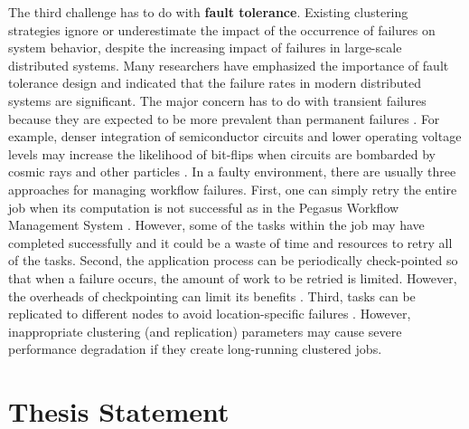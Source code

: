 The third challenge has to do with \textbf{fault tolerance}. Existing clustering strategies ignore or underestimate the impact of the occurrence of failures on system behavior, despite the increasing impact of failures in large-scale distributed systems. Many researchers \cite{Zhang2004, Tang1990, Schroeder2006, Sahoo2004} have emphasized the importance of fault tolerance design and indicated that the failure rates in modern distributed systems are significant. The major concern has to do with transient failures because they are expected to be more prevalent than permanent failures \cite{Zhang2004}. For example, denser integration of semiconductor circuits and lower operating voltage levels may increase the likelihood of bit-flips when circuits are bombarded by cosmic rays and other particles \cite{Zhang2004}. In a faulty environment, there are usually three approaches for managing workflow failures. First, one can simply retry the entire job when its computation is not successful as in the Pegasus Workflow Management System \cite{Deelman2004}. However, some of the tasks within the job may have completed successfully and it could be a waste of time and resources to retry all of the tasks. Second, the application process can be periodically check-pointed so that when a failure occurs, the amount of work to be retried is limited. However, the overheads of checkpointing can limit its benefits \cite{Zhang2004}. Third, tasks can be replicated to different nodes to avoid location-specific failures \cite{Zhang2009}. However, inappropriate clustering (and replication) parameters may cause severe performance degradation if they create long-running clustered jobs. 




\section{Thesis Statement}


